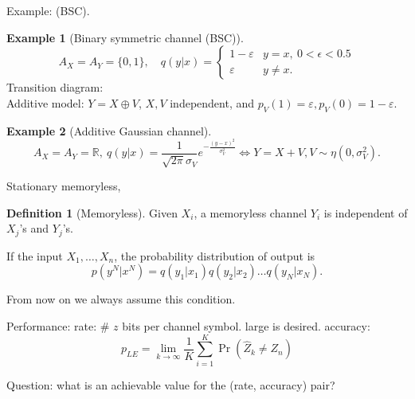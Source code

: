 \documentclass{report}
\newcommand{\R}{\mathbb{R}}
\theoremstyle{definition}
\newtheorem{definition}{Definition}[section]
\newtheorem{example}{Example}[section]
\theoremstyle{remark}
\numberwithin{equation}{section}
\begin{document}
Example:  (BSC).

\begin{example}[Binary symmetric channel (BSC)]
  \[A_X = A_Y = \{0, 1\},\quad  q(y|x) = \begin{cases}
    1 - \varepsilon & y = x,\ 0 < \epsilon < 0.5 \\
    \varepsilon & y \neq x.
  \end{cases}\]
  Transition diagram:
  \[\]
  Additive model: $Y = X \oplus V$, $X, V$ independent, and $p_V(1) = \varepsilon, p_V(0) = 1 - \varepsilon$.
\end{example}

\begin{example}[Additive Gaussian channel]
  \[A_X = A_Y = \R, \ q(y|x) = \frac{1}{\sqrt{2\pi}\sigma_V}e^{-\frac{(y-x)^2}{\sigma_V^2}} \iff  Y = X + V, V \sim \eta(0, \sigma_V^2).\]
\end{example}

Stationary memoryless,

\begin{definition}[Memoryless]
  Given $X_i$, a memoryless channel $Y_i$ is independent of $X_j$'s and $Y_j$'s.
\end{definition}

If the input $X_1, \ldots, X_n$, the probability distribution of output is \[
  p(y^N | x^N) = q(y_1|x_1)q(y_2|x_2)\ldots q(y_N|x_N).
\]

From now on we always assume this condition.

Performance: 
rate: \# $z$ bits per channel symbol. large is desired.
accuracy: \[p_{LE} = \lim_{k \to \infty}\frac{1}{K}\sum_{i=1}^K \Pr(\hat{Z}_k \neq Z_n)\]

Question: what is an achievable value for the (rate, accuracy) pair?
\end{document}
